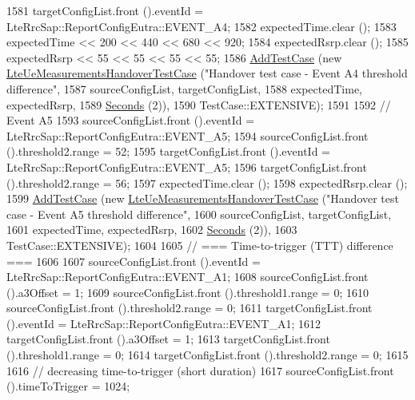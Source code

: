 \begin{DoxyCode}
1581   targetConfigList.front ().eventId = LteRrcSap::ReportConfigEutra::EVENT\_A4;
1582   expectedTime.clear ();
1583   expectedTime << 200 << 440 << 680 << 920;
1584   expectedRsrp.clear ();
1585   expectedRsrp << 55 << 55 << 55 << 55;
1586   \hyperlink{classns3_1_1TestCase_a3718088e3eefd5d6454569d2e0ddd835}{AddTestCase} (\textcolor{keyword}{new} \hyperlink{classLteUeMeasurementsHandoverTestCase}{LteUeMeasurementsHandoverTestCase} (\textcolor{stringliteral}{"Handover
       test case - Event A4 threshold difference"},
1587                                                       sourceConfigList, targetConfigList,
1588                                                       expectedTime, expectedRsrp,
1589                                                       \hyperlink{group__timecivil_ga33c34b816f8ff6628e33d5c8e9713b9e}{Seconds} (2)),
1590                TestCase::EXTENSIVE);
1591 
1592   \textcolor{comment}{// Event A5}
1593   sourceConfigList.front ().eventId = LteRrcSap::ReportConfigEutra::EVENT\_A5;
1594   sourceConfigList.front ().threshold2.range = 52;
1595   targetConfigList.front ().eventId = LteRrcSap::ReportConfigEutra::EVENT\_A5;
1596   targetConfigList.front ().threshold2.range = 56;
1597   expectedTime.clear ();
1598   expectedRsrp.clear ();
1599   \hyperlink{classns3_1_1TestCase_a3718088e3eefd5d6454569d2e0ddd835}{AddTestCase} (\textcolor{keyword}{new} \hyperlink{classLteUeMeasurementsHandoverTestCase}{LteUeMeasurementsHandoverTestCase} (\textcolor{stringliteral}{"Handover
       test case - Event A5 threshold difference"},
1600                                                       sourceConfigList, targetConfigList,
1601                                                       expectedTime, expectedRsrp,
1602                                                       \hyperlink{group__timecivil_ga33c34b816f8ff6628e33d5c8e9713b9e}{Seconds} (2)),
1603                TestCase::EXTENSIVE);
1604 
1605   \textcolor{comment}{// === Time-to-trigger (TTT) difference ===}
1606 
1607   sourceConfigList.front ().eventId = LteRrcSap::ReportConfigEutra::EVENT\_A1;
1608   sourceConfigList.front ().a3Offset = 1;
1609   sourceConfigList.front ().threshold1.range = 0;
1610   sourceConfigList.front ().threshold2.range = 0;
1611   targetConfigList.front ().eventId = LteRrcSap::ReportConfigEutra::EVENT\_A1;
1612   targetConfigList.front ().a3Offset = 1;
1613   targetConfigList.front ().threshold1.range = 0;
1614   targetConfigList.front ().threshold2.range = 0;
1615 
1616   \textcolor{comment}{// decreasing time-to-trigger (short duration)}
1617   sourceConfigList.front ().timeToTrigger = 1024;

\end{DoxyCode}
